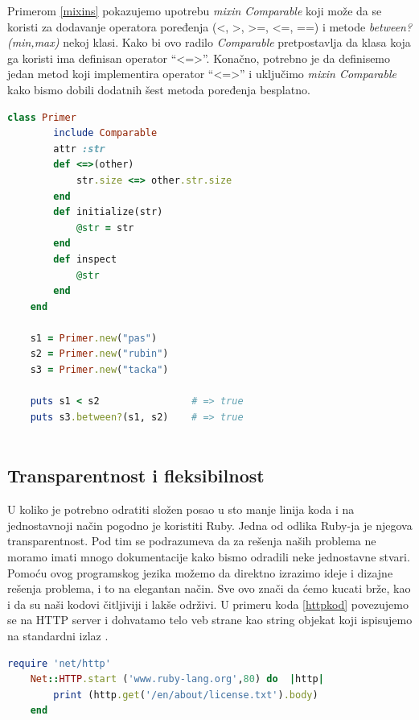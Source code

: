 \documentclass[a4paper]{article}
\begin{document}
Primerom \ref{mixins} pokazujemo upotrebu \emph{mixin Comparable} koji može da se koristi za dodavanje operatora poređenja (\textless , \textgreater , \textgreater =, \textless =, ==) i metode \emph{between?(min,max)} nekoj klasi. Kako bi ovo radilo \emph{Comparable} pretpostavlja da klasa koja ga koristi ima definisan operator  “\textless =\textgreater”. Konačno, potrebno je da definisemo jedan metod koji implementira operator “\textless =\textgreater” i uključimo \emph{mixin Comparable} kako bismo dobili dodatnih šest metoda poređenja besplatno.
\begin{lstlisting}[language=Ruby, caption={Primer koda}, frame=single, label=mixins]
	class Primer
		include Comparable
		attr :str
		def <=>(other)
			str.size <=> other.str.size
		end
		def initialize(str)
			@str = str
		end
		def inspect
			@str
		end
	end
	
	s1 = Primer.new("pas")
	s2 = Primer.new("rubin")
	s3 = Primer.new("tacka")
	
	puts s1 < s2 				# => true
	puts s3.between?(s1, s2)	# => true
	
\end{lstlisting}\vspace*{-15pt}

\subsection{Transparentnost i fleksibilnost}
U koliko je potrebno odratiti složen posao u sto manje linija koda i na jednostavnoji način pogodno je koristiti Ruby. %
Jedna od odlika Ruby-ja je njegova transparentnost. Pod tim se podrazumeva da za rešenja naših problema ne moramo imati mnogo dokumentacije kako bismo odradili neke jednostavne stvari. Pomoću ovog programskog jezika možemo da direktno izrazimo ideje i dizajne rešenja problema, i to na elegantan način. Sve ovo znači da ćemo kucati brže, kao i da su naši kodovi čitljiviji i lakše održivi. U primeru koda \ref{httpkod} povezujemo se na HTTP server i dohvatamo telo veb strane kao string objekat koji ispisujemo na standardni izlaz \cite{poignant}.
\begin{lstlisting}[language=Ruby, caption = "Primer koda", label=httpkod]
	require 'net/http'
	Net::HTTP.start ('www.ruby-lang.org',80) do  |http|
		print (http.get('/en/about/license.txt').body)
	end
\end{lstlisting}\vspace*{-15pt}
\end{document}
